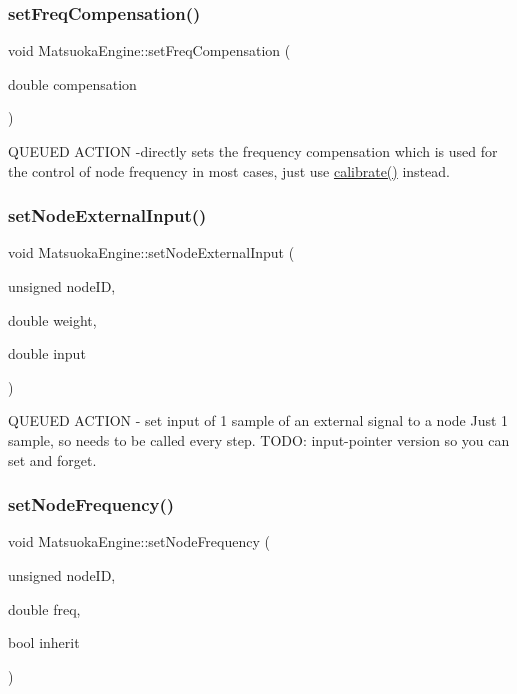 \subsubsection{\texorpdfstring{set\+Freq\+Compensation()}{setFreqCompensation()}}
{\footnotesize\ttfamily void Matsuoka\+Engine\+::set\+Freq\+Compensation (\begin{DoxyParamCaption}\item[{double}]{compensation }\end{DoxyParamCaption})}

Q\+U\+E\+U\+ED A\+C\+T\+I\+ON -\/directly sets the frequency compensation which is used for the control of node frequency in most cases, just use \mbox{\hyperlink{classMatsuokaEngine_a68d6295dfa0d28e3bc9d743e763d6ee9}{calibrate()}} instead. \mbox{\label{classMatsuokaEngine_a8eb38eaa5de05677243c5c7cd809af4d}} 
\subsubsection{\texorpdfstring{set\+Node\+External\+Input()}{setNodeExternalInput()}}
{\footnotesize\ttfamily void Matsuoka\+Engine\+::set\+Node\+External\+Input (\begin{DoxyParamCaption}\item[{unsigned}]{node\+ID,  }\item[{double}]{weight,  }\item[{double}]{input }\end{DoxyParamCaption})}

Q\+U\+E\+U\+ED A\+C\+T\+I\+ON -\/ set input of 1 sample of an external signal to a node Just 1 sample, so needs to be called every step. T\+O\+DO\+: input-\/pointer version so you can set and forget. \mbox{\label{classMatsuokaEngine_acd76608c9b7fb30bf9e0ed2ecd1ba40a}} 
\subsubsection{\texorpdfstring{set\+Node\+Frequency()}{setNodeFrequency()}}
{\footnotesize\ttfamily void Matsuoka\+Engine\+::set\+Node\+Frequency (\begin{DoxyParamCaption}\item[{unsigned}]{node\+ID,  }\item[{double}]{freq,  }\item[{bool}]{inherit }\end{DoxyParamCaption})}

